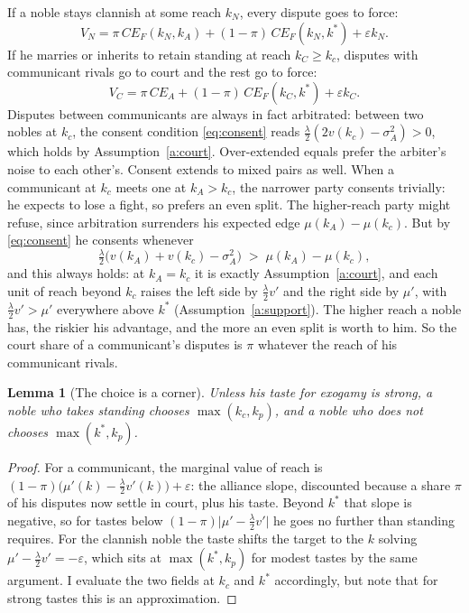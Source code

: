 \documentclass[12pt]{article}
\newtheorem{lemma}{Lemma}
\theoremstyle{definition}
\theoremstyle{remark}
\begin{document}
If a noble stays clannish at some reach $k_N$, every dispute goes to force:
\begin{equation}\label{eq:VN}
V_N = \pi\, CE_F(k_N,k_A) + (1-\pi)\, CE_F(k_N,k^\ast) + \varepsilon k_N .
\end{equation}
If he marries or inherits to retain standing at reach $k_C\ge k_c$, disputes with communicant rivals go to court and the rest go to force:
\begin{equation}\label{eq:VC}
V_C = \pi\, CE_A + (1-\pi)\, CE_F(k_C,k^\ast) + \varepsilon k_C .
\end{equation}
Disputes between communicants are always in fact arbitrated: between two nobles at $k_c$, the consent condition \eqref{eq:consent} reads $\tfrac{\lambda}{2}(2v(k_c)-\sigma^2_A)>0$, which holds by Assumption~\ref{a:court}. Over-extended equals prefer the arbiter's noise to each other's. Consent extends to mixed pairs as well. When a communicant at $k_c$ meets one at $k_A>k_c$, the narrower party consents trivially: he expects to lose a fight, so prefers an even split. The higher-reach party might refuse, since arbitration surrenders his expected edge $\mu(k_A)-\mu(k_c)$. But by \eqref{eq:consent} he consents whenever
\[
\tfrac{\lambda}{2}\bigl(v(k_A)+v(k_c)-\sigma^2_A\bigr) \;>\; \mu(k_A)-\mu(k_c),
\]
and this always holds: at $k_A=k_c$ it is exactly Assumption~\ref{a:court}, and each unit of reach beyond $k_c$ raises the left side by $\tfrac{\lambda}{2}v'$ and the right side by $\mu'$, with $\tfrac{\lambda}{2}v'>\mu'$ everywhere above $k^\ast$ (Assumption~\ref{a:support}). The higher reach a noble has, the riskier his advantage, and the more an even split is worth to him. So the court share of a communicant's disputes is $\pi$ whatever the reach of his communicant rivals.

\begin{lemma}[The choice is a corner]\label{l:binary}
Unless his taste for exogamy is strong, a noble who takes standing chooses $\max(k_c,k_p)$, and a noble who does not chooses $\max(k^\ast,k_p)$.
\end{lemma}
\begin{proof}
For a communicant, the marginal value of reach is $(1-\pi)\bigl(\mu'(k)-\tfrac{\lambda}{2}v'(k)\bigr)+\varepsilon$: the alliance slope, discounted because a share $\pi$ of his disputes now settle in court, plus his taste. Beyond $k^\ast$ that slope is negative, so for tastes below $(1-\pi)\lvert \mu'-\tfrac{\lambda}{2}v'\rvert$ he goes no further than standing requires. For the clannish noble the taste shifts the target to the $k$ solving $\mu'-\tfrac{\lambda}{2}v'=-\varepsilon$, which sits at $\max(k^\ast,k_p)$ for modest tastes by the same argument. I evaluate the two fields at $k_c$ and $k^\ast$ accordingly, but note that for strong tastes this is an approximation.
\end{proof}
\end{document}

